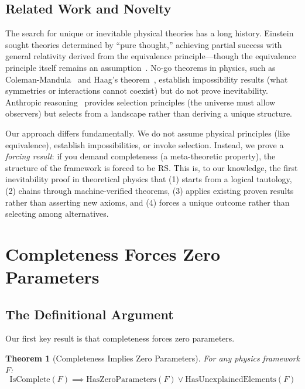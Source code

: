 \documentclass[12pt]{article}
\newtheorem{theorem}{Theorem}[section]
\theoremstyle{remark}
\begin{document}
\subsection{Related Work and Novelty}

The search for unique or inevitable physical theories has a long history. Einstein sought theories determined by ``pure thought,'' achieving partial success with general relativity derived from the equivalence principle---though the equivalence principle itself remains an assumption~\cite{Einstein1916,Weinberg1972}. No-go theorems in physics, such as Coleman-Mandula~\cite{ColemanMandula1967} and Haag's theorem~\cite{Haag1955}, establish impossibility results (what symmetries or interactions cannot coexist) but do not prove inevitability. Anthropic reasoning~\cite{Barrow1986,Tegmark2008} provides selection principles (the universe must allow observers) but selects from a landscape rather than deriving a unique structure.

Our approach differs fundamentally. We do not assume physical principles (like equivalence), establish impossibilities, or invoke selection. Instead, we prove a \emph{forcing result}: if you demand completeness (a meta-theoretic property), the structure of the framework is forced to be RS. This is, to our knowledge, the first inevitability proof in theoretical physics that (1) starts from a logical tautology, (2) chains through machine-verified theorems, (3) applies existing proven results rather than asserting new axioms, and (4) forces a unique outcome rather than selecting among alternatives.

\section{Completeness Forces Zero Parameters}

\subsection{The Definitional Argument}

Our first key result is that completeness forces zero parameters.

\begin{theorem}[Completeness Implies Zero Parameters]\label{thm:complete-to-zero}
For any physics framework $F$:
\[
\mathrm{IsComplete}(F) \implies \mathrm{HasZeroParameters}(F) \lor \mathrm{HasUnexplainedElements}(F)
\]
\end{theorem}
\end{document}

